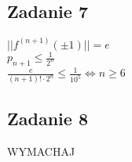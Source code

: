 \documentclass[a4paper]{article}
\begin{document}
\subsection*{Zadanie 7}
$||f^{(n+1)}(\pm 1)|| = e$\\
$p_{n+1} \leq \frac{1}{2^n}$\\
$\frac{e}{(n+1)!\cdot 2^n} \leq \frac{1}{10^5} \Leftrightarrow n \geq 6$

\subsection*{Zadanie 8}
WYMACHAJ
\end{document}
